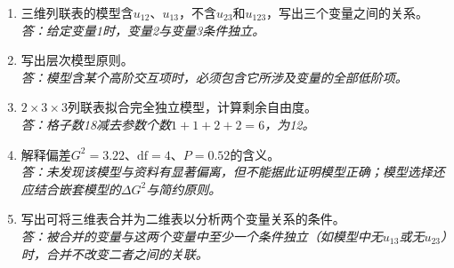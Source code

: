 \begin{fuxi}[复习题]
\begin{enumerate}
\item 三维列联表的模型含$u_{12}$、$u_{13}$，不含$u_{23}$和$u_{123}$，写出三个变量之间的关系。\\
\textit{答：给定变量1时，变量2与变量3条件独立。}
\item 写出层次模型原则。\\
\textit{答：模型含某个高阶交互项时，必须包含它所涉及变量的全部低阶项。}
\item $2\times3\times3$列联表拟合完全独立模型，计算剩余自由度。\\
\textit{答：格子数18减去参数个数$1+1+2+2=6$，为12。}
\item 解释偏差$G^2=3.22$、$\mathrm{df}=4$、$P=0.52$的含义。\\
\textit{答：未发现该模型与资料有显著偏离，但不能据此证明模型正确；模型选择还应结合嵌套模型的$\Delta G^2$与简约原则。}
\item 写出可将三维表合并为二维表以分析两个变量关系的条件。\\
\textit{答：被合并的变量与这两个变量中至少一个条件独立（如模型中无$u_{13}$或无$u_{23}$）时，合并不改变二者之间的关联。}
\end{enumerate}
\end{fuxi}

